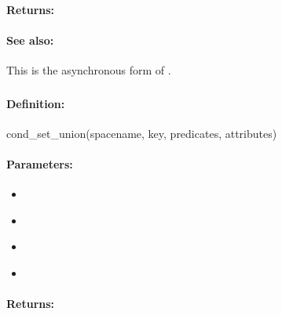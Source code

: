 \paragraph{Returns:}


\paragraph{See also:}  This is the asynchronous form of .

\pagebreak
\subsubsection{}
\label{api:ruby:cond_set_union}


\paragraph{Definition:}
\begin{rubycode}
cond_set_union(spacename, key, predicates, attributes)
\end{rubycode}

\paragraph{Parameters:}
\begin{itemize}[noitemsep]
\item {}\\

\item {}\\

\item {}\\

\item {}\\

\end{itemize}

\paragraph{Returns:}


